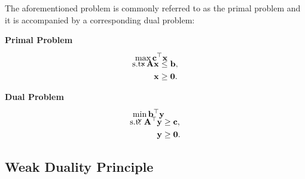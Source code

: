 \documentclass[twoside]{article}
\begin{document}
The aforementioned problem is commonly referred to as the primal problem and it
is accompanied by a corresponding dual problem:
\begin{center}
    \begin{minipage}[t]{0.35\textwidth}
        \centering
        \textbf{Primal Problem}
        \vspace{-0.5cm}
        \begin{align*}
            \intertext{
                $\displaystyle \max_{\mathbf{x}}
                    \mathbf{c}^\top \mathbf{x}$
                \vspace{-0.5cm}
            }
            \text{s.t.}\ \mathbf{Ax} &\leq \mathbf{b}, \\
                               \mathbf{x} &\geq \mathbf{0}.
        \end{align*}
    \end{minipage}%
    \begin{minipage}[t]{0.35\textwidth}
        \centering
        \textbf{Dual Problem}
        \vspace{-0.5cm}
        \begin{align*}
            \intertext{
                $\displaystyle \min_{\mathbf{y}}
                    \mathbf{b}^\top \mathbf{y}$
                \vspace{-0.5cm}
            }
            \text{s.t.}\ \mathbf{A}^\top \mathbf{y} &\geq \mathbf{c}, \\
                                              \mathbf{y} &\geq \mathbf{0}.
        \end{align*}
    \end{minipage}
\end{center}

\subsection{Weak Duality Principle}
\end{document}

